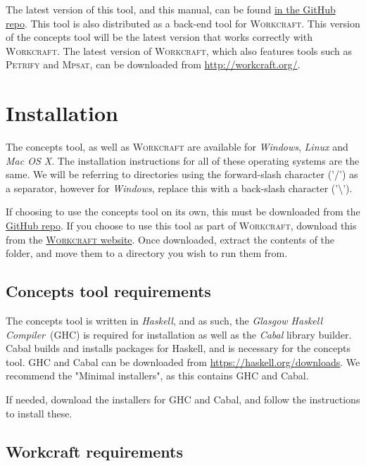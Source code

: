 \documentclass{proc}
\newcommand{\noun}[1]{\textsc{#1}}
\begin{document}
The latest version of this tool, and this manual, can be found \href{https://github.com/tuura/concepts}{in the GitHub repo}. This tool is also distributed as a back-end tool for 
\noun{Workcraft}. This version of the concepts tool will be the latest version that works correctly with \noun{Workcraft}. The latest version of \noun{Workcraft}, which also features tools 
 such as \noun{Petrify} and \noun{Mpsat}, can be downloaded from \url{http://workcraft.org/}. 

\section{Installation}

The concepts tool, as well as \noun{Workcraft} are available for \emph{Windows}, \emph{Linux} and \emph{Mac OS X}. The installation instructions for all of these operating systems are 
the same. We will be referring to directories using the forward-slash character ('/') as a separator, however for \emph{Windows}, replace this with a back-slash character 
('\textbackslash').

If choosing to use the concepts tool on its own, this must be 
downloaded from the \href{https://github.com/tuura/concepts}{GitHub repo}. If you choose to use this tool as part of \noun{Workcraft}, download this from the 
\href{http://workcraft.org/}{\noun{Workcraft} website}. Once downloaded, extract the contents of the folder, and move them to a directory you wish to run them from. 

\subsection{Concepts tool requirements\label{sub:Concepts_requirements}}

The concepts tool is written in \emph{Haskell}, and as such, the \emph{Glasgow Haskell Compiler}~(GHC) is required for installation as well as the \emph{Cabal} library builder. 
Cabal builds and installs packages for Haskell, and is necessary for the concepts tool. GHC and Cabal can be downloaded from \url{https://haskell.org/downloads}. We recommend the
 "Minimal installers", as this contains GHC and Cabal.

If needed, download the installers for GHC and Cabal, and follow the instructions to install these.

\subsection{Workcraft requirements}
\end{document}

